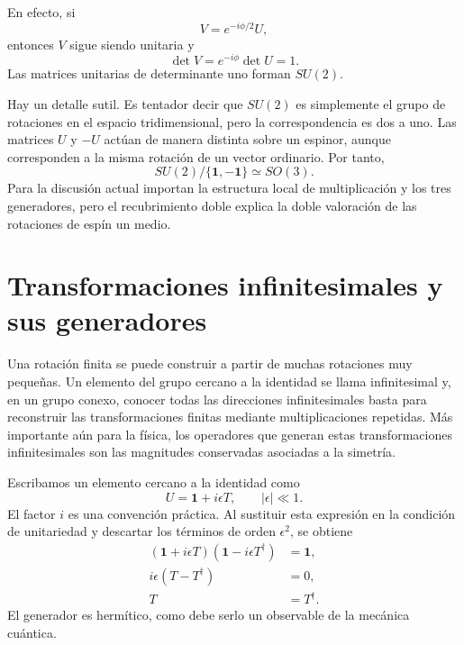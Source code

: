 \begin{classroomqa}
\end{classroomqa}

En efecto, si
\begin{equation}
V=e^{-i\phi/2}U,
\end{equation}
entonces \(V\) sigue siendo unitaria y
\begin{equation}
\det V=e^{-i\phi}\det U=1.
\end{equation}
Las matrices unitarias de determinante uno forman \(SU(2)\).

Hay un detalle sutil. Es tentador decir que \(SU(2)\) es simplemente el grupo de rotaciones en el espacio tridimensional, pero la correspondencia es dos a uno. Las matrices \(U\) y \(-U\) actúan de manera distinta sobre un espinor, aunque corresponden a la misma rotación de un vector ordinario. Por tanto,
\begin{equation}
SU(2)/\{\boldsymbol 1,-\boldsymbol 1\}\simeq SO(3).
\end{equation}
Para la discusión actual importan la estructura local de multiplicación y los tres generadores, pero el recubrimiento doble explica la doble valoración de las rotaciones de espín un medio.

\section{Transformaciones infinitesimales y sus generadores}

Una rotación finita se puede construir a partir de muchas rotaciones muy pequeñas. Un elemento del grupo cercano a la identidad se llama infinitesimal y, en un grupo conexo, conocer todas las direcciones infinitesimales basta para reconstruir las transformaciones finitas mediante multiplicaciones repetidas. Más importante aún para la física, los operadores que generan estas transformaciones infinitesimales son las magnitudes conservadas asociadas a la simetría.

Escribamos un elemento cercano a la identidad como
\begin{equation}
U=\boldsymbol 1+i\epsilon T,
\qquad |\epsilon|\ll1.
\label{eq:l4-infinitesimal-u}
\end{equation}
El factor \(i\) es una convención práctica. Al sustituir esta expresión en la condición de unitariedad y descartar los términos de orden \(\epsilon^2\), se obtiene
\begin{align}
(\boldsymbol 1+i\epsilon T)
(\boldsymbol 1-i\epsilon T^\dagger)&=\boldsymbol 1,
\\
i\epsilon(T-T^\dagger)&=0,
\\
T&=T^\dagger.
\label{eq:l4-hermitian-generator}
\end{align}
El generador es hermítico, como debe serlo un observable de la mecánica cuántica.

